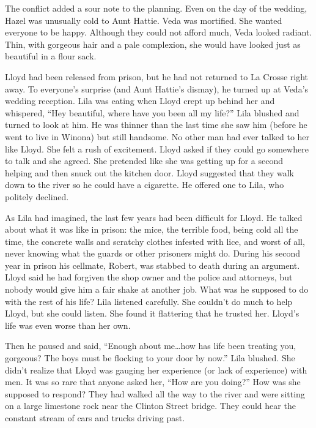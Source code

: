 \documentclass[
  letterpaper,
]{book}
\begin{document}
The conflict added a sour note to the planning. Even on the day of the
wedding, Hazel was unusually cold to Aunt Hattie. Veda was mortified.
She wanted everyone to be happy. Although they could not afford much,
Veda looked radiant. Thin, with gorgeous hair and a pale complexion, she
would have looked just as beautiful in a flour sack.

Lloyd had been released from prison, but he had not returned to La
Crosse right away. To everyone's surprise (and Aunt Hattie's dismay), he
turned up at Veda's wedding reception. Lila was eating when Lloyd crept
up behind her and whispered, ``Hey beautiful, where have you been all my
life?'' Lila blushed and turned to look at him. He was thinner than the
last time she saw him (before he went to live in Winona) but still
handsome. No other man had ever talked to her like Lloyd. She felt a
rush of excitement. Lloyd asked if they could go somewhere to talk and
she agreed. She pretended like she was getting up for a second helping
and then snuck out the kitchen door. Lloyd suggested that they walk down
to the river so he could have a cigarette. He offered one to Lila, who
politely declined.

As Lila had imagined, the last few years had been difficult for Lloyd.
He talked about what it was like in prison: the mice, the terrible food,
being cold all the time, the concrete walls and scratchy clothes
infested with lice, and worst of all, never knowing what the guards or
other prisoners might do. During his second year in prison his cellmate,
Robert, was stabbed to death during an argument. Lloyd said he had
forgiven the shop owner and the police and attorneys, but nobody would
give him a fair shake at another job. What was he supposed to do with
the rest of his life? Lila listened carefully. She couldn't do much to
help Lloyd, but she could listen. She found it flattering that he
trusted her. Lloyd's life was even worse than her own.

Then he paused and said, ``Enough about me\ldots how has life been
treating you, gorgeous? The boys must be flocking to your door by now.''
Lila blushed. She didn't realize that Lloyd was gauging her experience
(or lack of experience) with men. It was so rare that anyone asked her,
``How are you doing?'' How was she supposed to respond? They had walked
all the way to the river and were sitting on a large limestone rock near
the Clinton Street bridge. They could hear the constant stream of cars
and trucks driving past.
\end{document}
